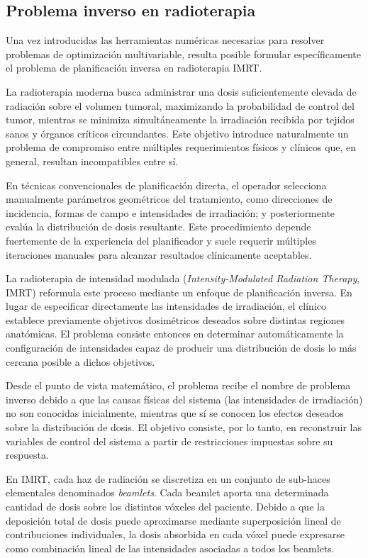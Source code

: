 \subsection{Problema inverso en radioterapia}

Una vez introducidas las herramientas numéricas necesarias para resolver problemas de optimización multivariable, resulta posible formular específicamente el problema de planificación inversa en radioterapia IMRT.

La radioterapia moderna busca administrar una dosis suficientemente elevada de radiación sobre el volumen tumoral, maximizando la probabilidad de control del tumor, mientras se minimiza simultáneamente la irradiación recibida por tejidos sanos y órganos críticos circundantes. Este objetivo introduce naturalmente un problema de compromiso entre múltiples requerimientos físicos y clínicos que, en general, resultan incompatibles entre sí.

En técnicas convencionales de planificación directa, el operador selecciona manualmente parámetros geométricos del tratamiento, como direcciones de incidencia, formas de campo e intensidades de irradiación; y posteriormente evalúa la distribución de dosis resultante. Este procedimiento depende fuertemente de la experiencia del planificador y suele requerir múltiples iteraciones manuales para alcanzar resultados clínicamente aceptables.

La radioterapia de intensidad modulada (\textit{Intensity-Modulated Radiation Therapy}, IMRT) reformula este proceso mediante un enfoque de planificación inversa. En lugar de especificar directamente las intensidades de irradiación, el clínico establece previamente objetivos dosimétricos deseados sobre distintas regiones anatómicas. El problema consiste entonces en determinar automáticamente la configuración de intensidades capaz de producir una distribución de dosis lo más cercana posible a dichos objetivos.

Desde el punto de vista matemático, el problema recibe el nombre de problema inverso debido a que las causas físicas del sistema (las intensidades de irradiación) no son conocidas inicialmente, mientras que sí se conocen los efectos deseados sobre la distribución de dosis. El objetivo consiste, por lo tanto, en reconstruir las variables de control del sistema a partir de restricciones impuestas sobre su respuesta.

En IMRT, cada haz de radiación se discretiza en un conjunto de sub-haces elementales denominados \textit{beamlets}. Cada beamlet aporta una determinada cantidad de dosis sobre los distintos vóxeles del paciente. Debido a que la deposición total de dosis puede aproximarse mediante superposición lineal de contribuciones individuales, la dosis absorbida en cada vóxel puede expresarse como combinación lineal de las intensidades asociadas a todos los beamlets.

